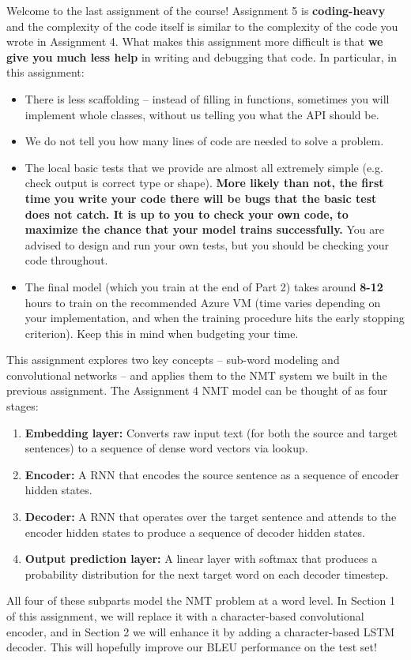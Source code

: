 \begin{framed}
    \noindent
    Welcome to the last assignment of the course! Assignment 5 is \textbf{coding-heavy} and the complexity of the code itself is similar to the complexity of the code you wrote in Assignment 4.
    What makes this assignment more difficult is that \textbf{we give you much less help} in writing and debugging that code.
    In particular, in this assignment:
    \begin{itemize}
        \item There is less scaffolding -- instead of filling in functions, sometimes you will implement whole classes, without us telling you what the API should be.
        \item We do not tell you how many lines of code are needed to solve a problem.
        \item The local basic tests that we provide are almost all extremely simple (e.g. check output is correct type or shape). \textbf{More likely than not, the first time you write your code there will be bugs that the basic test does not catch. 
        It is up to you to check your own code, to maximize the chance that your model trains successfully.}
        You are advised to design and run your own tests, but you should be checking your code throughout.
        \item The final model (which you train at the end of Part 2) takes around \textbf{8-12} hours to train on the recommended Azure VM (time varies depending on your implementation, and when the training procedure hits the early stopping criterion). Keep this in mind when budgeting your time.
    \end{itemize}
\end{framed}  
    
This assignment explores two key concepts -- sub-word modeling and convolutional networks -- and applies them to the NMT system we built in the previous assignment. The Assignment 4 NMT model can be thought of as four stages: 
\begin{enumerate}
    \item \textbf{Embedding layer:} Converts raw input text (for both the source and target sentences) to a sequence of dense word vectors via lookup.
    \item \textbf{Encoder:} A RNN that encodes the source sentence as a sequence of encoder hidden states.
    \item \textbf{Decoder:} A RNN that operates over the target sentence and attends to the encoder hidden states to produce a sequence of decoder hidden states.
    \item \textbf{Output prediction layer:} A linear layer with softmax that produces a probability distribution for the next target word on each decoder timestep.
\end{enumerate}
All four of these subparts model the NMT problem at a word level.
In Section 1 of this assignment, we will replace it with a character-based convolutional encoder, and in Section 2 we will enhance it by adding a character-based LSTM decoder.
This will hopefully improve our BLEU performance on the test set!